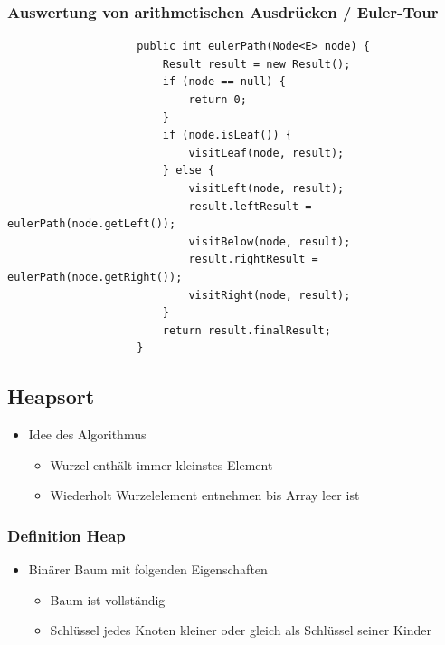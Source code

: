 \documentclass[a4paper, landscape, 8pt]{scrartcl}
\begin{document}
\begin{multicols*}{4}
                \subsubsection{Auswertung von arithmetischen Ausdrücken / Euler-Tour}
                    \begin{lstlisting}
                    public int eulerPath(Node<E> node) {
                        Result result = new Result();
                        if (node == null) {
                            return 0;
                        }
                        if (node.isLeaf()) {
                            visitLeaf(node, result);
                        } else {
                            visitLeft(node, result);
                            result.leftResult = eulerPath(node.getLeft());
                            visitBelow(node, result);
                            result.rightResult = eulerPath(node.getRight());
                            visitRight(node, result);
                        }
                        return result.finalResult;
                    }
                    \end{lstlisting}

            \subsection{Heapsort}
                \begin{itemize}
                    \item Idee des Algorithmus
                    \begin{itemize}
                        \item Wurzel enthält immer kleinstes Element
                        \item Wiederholt Wurzelelement entnehmen bis Array leer ist
                    \end{itemize}
                \end{itemize}
                \subsubsection{Definition Heap}
                    \begin{itemize}
                        \item Binärer Baum mit folgenden Eigenschaften
                        \begin{itemize}
                            \item Baum ist vollständig
                            \item Schlüssel jedes Knoten kleiner oder gleich als Schlüssel seiner Kinder
                        \end{itemize}
                    \end{itemize}

\end{multicols*}
\end{document}
